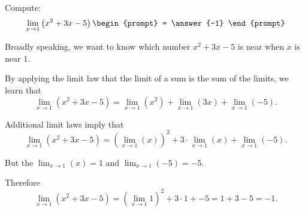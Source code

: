 \documentclass{ximera}
\author{Gregory Hartman \and Matthew Carr}
\begin{document}
\begin{exercise}


  Compute:
  \[
  \lim_{x\to 1} \left( x^2+3x-5 \right)
  \begin{prompt}
    = \answer{-1}
  \end{prompt}
  \]
  
  \begin{hint}
    Broadly speaking, we want to know which number $x^2+3x-5$ is near
    when $x$ is near $1$.
  \end{hint}
  
  \begin{hint}
    By applying the limit law that the limit of a sum is the sum of the limits, we learn that
    \[
    \lim_{x\to 1} \left( x^2+3x-5 \right)  
    = \lim_{x\to 1} \left( x^2 \right) +
    \lim_{x\to 1} \left( 3x \right) +
    \lim_{x\to 1} \left( -5 \right).
    \]
  \end{hint}
  
  \begin{hint}
    Additional limit laws imply that
    \[
    \lim_{x\to 1} \left( x^2+3x-5 \right)  
    = \left( \lim_{x\to 1} \left( x \right) \right)^2 +
    3 \cdot \lim_{x\to 1} \left( x \right) +
    \lim_{x\to 1} \left( -5 \right).
    \]
  \end{hint}
  
  \begin{hint}
    But the $\lim_{x\to 1} \left( x \right) = 1$ and $\lim_{x\to 1} \left( -5 \right) = -5$.
  \end{hint}
  
  \begin{hint}
    Therefore
    \[
    \lim_{x\to 1} \left( x^2+3x-5 \right)  
    = \left( \lim_{x\to 1} 1 \right)^2 +
    3 \cdot 1 + 
    -5 = 1 + 3 - 5 = -1.
    \]
  \end{hint}
  
\end{exercise}
\end{document}
